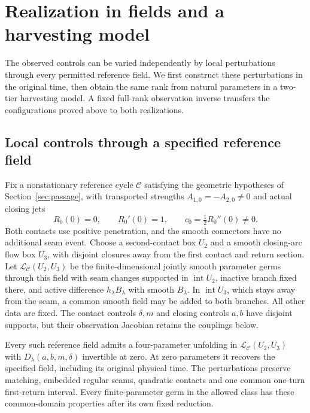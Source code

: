 \section{Realization in fields and a harvesting model}
\label{sec:sharpness}

The observed controls can be varied independently by local perturbations
through every permitted reference field. We first construct these
perturbations in the original time, then obtain the same rank from natural
parameters in a two-tier harvesting model. A fixed full-rank observation inverse
transfers the configurations proved above to both realizations.

\subsection{Local controls through a specified reference field}
\label{subsec:specified-field}

Fix a nonstationary reference cycle \(\mathcal C\) satisfying the geometric
hypotheses of Section~\ref{sec:passage}, with transported strengths
\(A_{1,0}=-A_{2,0}\ne0\) and actual closing jets
\[
 R_0(0)=0,\qquad R_0'(0)=1,\qquad
 c_0=\tfrac12R_0''(0)\ne0.
\]
Both contacts use positive penetration, and the smooth connectors have
no additional seam event. Choose a second-contact box \(U_2\) and a
smooth closing-arc flow box \(U_3\), with disjoint closures away from
the first contact and return section.
Let \(\mathcal L_{\mathcal C}(U_2,U_3)\) be the finite-dimensional
jointly smooth parameter germs through this field with seam changes
supported in \(\operatorname{int}U_2\), inactive branch fixed there,
and active difference \(h_\lambda B_\lambda\) with smooth
\(B_\lambda\). In \(\operatorname{int}U_3\), which stays away
from the seam, a common smooth field may be added to both branches.
All other data are fixed. The contact controls \(\delta,m\) and
closing controls \(a,b\) have disjoint supports, but their observation
Jacobian retains the couplings below.

\begin{proposition}
\label{prop:specified-rank}
Every such reference field admits a four-parameter unfolding in
\(\mathcal L_{\mathcal C}(U_2,U_3)\) with
\(D_\lambda(a,b,m,\delta)\) invertible at zero. At zero parameters
it recovers the specified field, including its original physical time.
The perturbations preserve matching, embedded regular seams, quadratic
contacts and one common one-turn first-return interval. Every
finite-parameter germ in the allowed class has these common-domain
properties after its own fixed reduction.
\end{proposition}


